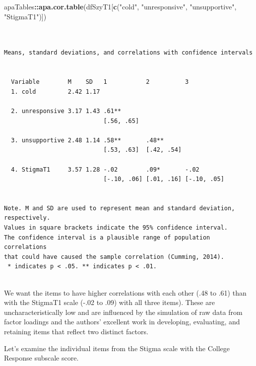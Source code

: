 \documentclass[
  english,
]{book}
\newenvironment{Shaded}{\begin{snugshade}}{\end{snugshade}}
\newcommand{\KeywordTok}[1]{\textcolor[rgb]{0.13,0.29,0.53}{\textbf{#1}}}
\newcommand{\NormalTok}[1]{#1}
\newcommand{\OperatorTok}[1]{\textcolor[rgb]{0.81,0.36,0.00}{\textbf{#1}}}
\newcommand{\StringTok}[1]{\textcolor[rgb]{0.31,0.60,0.02}{#1}}
\begin{document}
\begin{Shaded}
\begin{Highlighting}[]
\NormalTok{apaTables}\OperatorTok{::}\KeywordTok{apa.cor.table}\NormalTok{(dfSzyT1[}\KeywordTok{c}\NormalTok{(}\StringTok{"cold"}\NormalTok{, }\StringTok{"unresponsive"}\NormalTok{, }\StringTok{"unsupportive"}\NormalTok{, }\StringTok{"StigmaT1"}\NormalTok{)])}
\end{Highlighting}
\end{Shaded}

\begin{verbatim}


Means, standard deviations, and correlations with confidence intervals
 

  Variable        M    SD   1           2          3          
  1. cold         2.42 1.17                                   
                                                              
  2. unresponsive 3.17 1.43 .61**                             
                            [.56, .65]                        
                                                              
  3. unsupportive 2.48 1.14 .58**       .48**                 
                            [.53, .63]  [.42, .54]            
                                                              
  4. StigmaT1     3.57 1.28 -.02        .09*       -.02       
                            [-.10, .06] [.01, .16] [-.10, .05]
                                                              

Note. M and SD are used to represent mean and standard deviation, respectively.
Values in square brackets indicate the 95% confidence interval.
The confidence interval is a plausible range of population correlations 
that could have caused the sample correlation (Cumming, 2014).
 * indicates p < .05. ** indicates p < .01.
 
\end{verbatim}

We want the items to have higher correlations with each other (.48 to .61) than with the StigmaT1 scale (-.02 to .09) with all three items). These are uncharacteristically low and are influenced by the simulation of raw data from factor loadings and the authors' excellent work in developing, evaluating, and retaining items that reflect two distinct factors.

Let's examine the individual items from the Stigma scale with the College Response subscale score.
\end{document}
